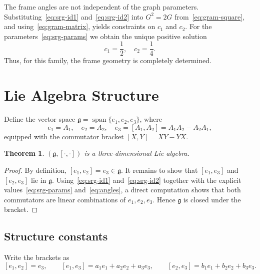 \documentclass[a4paper]{amsart}
\theoremstyle{plain}
\newtheorem{theorem}{Theorem}[section]
\theoremstyle{definition}
\theoremstyle{remark}
\newcommand{\g}{\mathfrak{g}}
\begin{document}
	The frame angles are not independent of the graph parameters. Substituting~\eqref{eq:srg-id1} and~\eqref{eq:srg-id2} into $G^2 = 2G$ from~\eqref{eq:gram-square}, and using~\eqref{eq:gram-matrix}, yields constraints on $c_1$ and $c_2$. For the parameters~\eqref{eq:srg-params} we obtain the unique positive solution
	\begin{equation}
		c_1 = \frac{1}{2},\quad c_2 = \frac{1}{4}. \label{eq:angles}
	\end{equation}
	Thus, for this family, the frame geometry is completely determined.
	
	\section{Lie Algebra Structure}
	\label{sec:lie}
	
	Define the vector space $\g = \operatorname{span}\{e_1, e_2, e_3\}$, where
	\[
	e_1 = A_1,\quad e_2 = A_2,\quad e_3 = [A_1, A_2] = A_1A_2 - A_2A_1,
	\]
	equipped with the commutator bracket $[X,Y] = XY - YX$.
	
	\begin{theorem} $(\g, [\cdot,\cdot])$ is a three-dimensional Lie algebra.
	\end{theorem}
	\begin{proof} By definition, $[e_1,e_2] = e_3 \in \g$. It remains to show that $[e_1,e_3]$ and $[e_2,e_3]$ lie in $\g$. Using~\eqref{eq:srg-id1} and~\eqref{eq:srg-id2} together with the explicit values~\eqref{eq:srg-params} and~\eqref{eq:angles}, a direct computation shows that both commutators are linear combinations of $e_1, e_2, e_3$. Hence $\g$ is closed under the bracket.
	\end{proof}
	
	\subsection{Structure constants}
	\label{subsec:structure}
	
	Write the brackets as
	\[
	[e_1,e_2] = e_3, \qquad [e_1,e_3] = a_1 e_1 + a_2 e_2 + a_3 e_3, \qquad [e_2,e_3] = b_1 e_1 + b_2 e_2 + b_3 e_3.
	\]
	
\end{document}
